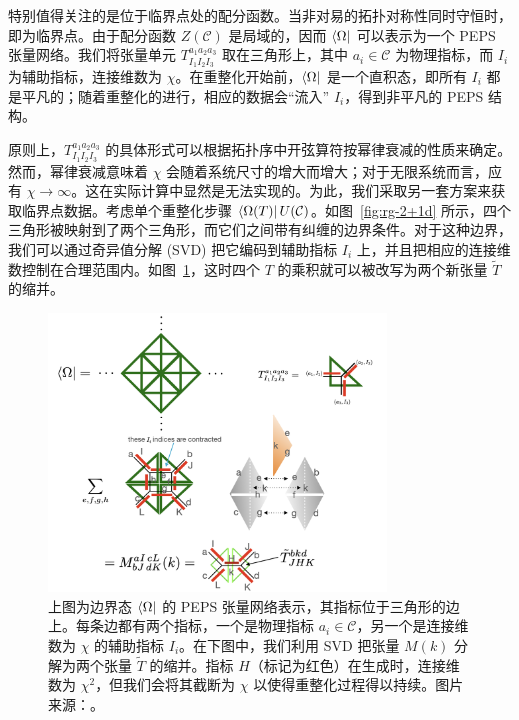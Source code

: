 
特别值得关注的是位于临界点处的配分函数。当非对易的拓扑对称性同时守恒时，即为临界点。由于配分函数 $Z(\mathcal{C})$ 是局域的，因而 $\bra{\Omega}$ 可以表示为一个 PEPS 张量网络。我们将张量单元 $T^{a_1 a_2 a_3}_{I_1 I_2 I_3}$ 取在三角形上，其中 $a_i\in\mathcal{C}$ 为物理指标，而 $I_i$ 为辅助指标，连接维数为 $\chi$。在重整化开始前，$\bra{\Omega}$ 是一个直积态，即所有 $I_i$ 都是平凡的；随着重整化的进行，相应的数据会“流入” $I_i$，得到非平凡的 PEPS 结构。

原则上，$T^{a_1 a_2 a_3}_{I_1 I_2 I_3}$ 的具体形式可以根据拓扑序中开弦算符按幂律衰减的性质来确定。然而，幂律衰减意味着 $\chi$ 会随着系统尺寸的增大而增大；对于无限系统而言，应有 $\chi\to\infty$。这在实际计算中显然是无法实现的。为此，我们采取另一套方案来获取临界点数据。考虑单个重整化步骤 $\bra{\Omega(T)}U(\mathcal{C})$。如图~\ref{fig:rg-2+1d} 所示，四个三角形被映射到了两个三角形，而它们之间带有纠缠的边界条件。对于这种边界，我们可以通过奇异值分解 (SVD) 把它编码到辅助指标 $I_i$ 上，并且把相应的连接维数控制在合理范围内。如图~\ref{fig:rg-2+1d-blocking}，这时四个 $T$ 的乘积就可以被改写为两个新张量 $\tilde{T}$ 的缩并。

\begin{figure}[htb]
  \centering
  \includegraphics[width=0.8\textwidth]{images/holographic/rg-2+1d-blocking.png}
  \caption[边界态 $\bra{\Omega}$ 的 PEPS 张量网络表示]{上图为边界态 $\bra{\Omega}$ 的 PEPS 张量网络表示，其指标位于三角形的边上。每条边都有两个指标，一个是物理指标 $a_i\in\mathcal{C}$，另一个是连接维数为 $\chi$ 的辅助指标 $I_i$。在下图中，我们利用 SVD 把张量 $M(k)$ 分解为两个张量 $\tilde{T}$ 的缩并。指标 $H$（标记为红色）在生成时，连接维数为 $\chi^2$，但我们会将其截断为 $\chi$ 以使得重整化过程得以持续。图片来源：\parencite{chen2022exact}。}
  \label{fig:rg-2+1d-blocking}
\end{figure}

